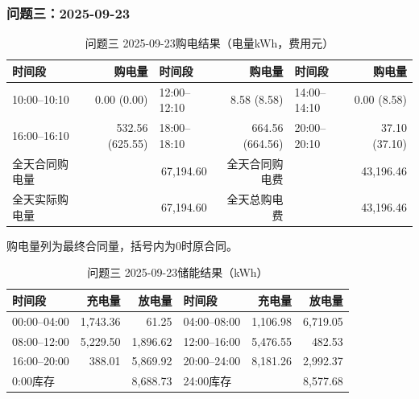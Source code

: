 \par\medskip
\par\noindent\begin{minipage}{\textwidth}
\subsubsection*{问题三：2025-09-23}
\begin{table}[H]\centering\small\setlength{\tabcolsep}{4pt}\caption{问题三 2025-09-23购电结果（电量kWh，费用元）}
\begin{tabular}{lr lr lr}\toprule
时间段 & 购电量 & 时间段 & 购电量 & 时间段 & 购电量\\\midrule
10:00--10:10 & 0.00 (0.00) & 12:00--12:10 & 8.58 (8.58) & 14:00--14:10 & 0.00 (8.58)\\
16:00--16:10 & 532.56 (625.55) & 18:00--18:10 & 664.56 (664.56) & 20:00--20:10 & 37.10 (37.10)\\
\midrule
全天合同购电量 & \multicolumn{2}{r}{67,194.60} & 全天合同购电费 & \multicolumn{2}{r}{43,196.46}\\
全天实际购电量 & \multicolumn{2}{r}{67,194.60} & 全天总购电费 & \multicolumn{2}{r}{43,196.46}\\
\bottomrule\end{tabular}\end{table}
\noindent\small 购电量列为最终合同量，括号内为0时原合同。\normalsize
\begin{table}[H]\centering\small\setlength{\tabcolsep}{4pt}\caption{问题三 2025-09-23储能结果（kWh）}
\begin{tabular}{lrr lrr}\toprule
时间段 & 充电量 & 放电量 & 时间段 & 充电量 & 放电量\\\midrule
00:00--04:00 & 1,743.36 & 61.25 & 04:00--08:00 & 1,106.98 & 6,719.05\\
08:00--12:00 & 5,229.50 & 1,896.62 & 12:00--16:00 & 5,476.55 & 482.53\\
16:00--20:00 & 388.01 & 5,869.92 & 20:00--24:00 & 8,181.26 & 2,992.37\\
\midrule
0:00库存 & \multicolumn{2}{r}{8,688.73} & 24:00库存 & \multicolumn{2}{r}{8,577.68}\\
\bottomrule\end{tabular}\end{table}
\end{minipage}\par

